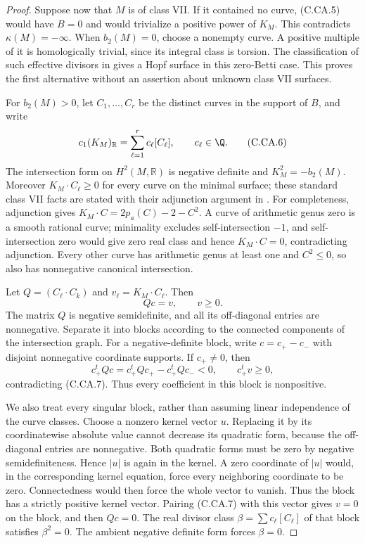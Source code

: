 \begin{proof}
Suppose now that $M$ is of class VII. If it contained no
curve, (C.CA.5) would have $B=0$ and would trivialize a
positive power of $K_M$. This contradicts
$\kappa(M)=-\infty$. When $b_2(M)=0$, choose a nonempty
curve. A positive multiple of it is homologically trivial,
since its integral class is torsion. The classification
of such effective divisors in
\cite[Remark~2.7]{DlousskyTeleman2012} gives a Hopf
surface in this zero-Betti case. This proves the first
alternative without an assertion about unknown class VII
surfaces.

For $b_2(M)>0$, let $C_1,\ldots,C_r$ be the distinct
curves in the support of $B$, and write
\[
 c_1(K_M)_{\mathbb R}=\sum_{\ell=1}^r c_\ell[C_\ell],
 \qquad c_\ell\in\Q.                                  \tag{C.CA.6}
\]
The intersection form on $H^2(M,\mathbb R)$ is negative
definite and $K_M^2=-b_2(M)$. Moreover
$K_M\cdot C_\ell\ge0$ for every curve on the minimal
surface; these standard class VII facts are stated with
their adjunction argument in \cite[\S1, pp.~4--5]{Dloussky2006}.
For completeness, adjunction gives
$K_M\cdot C=2p_a(C)-2-C^2$. A curve of arithmetic genus
zero is a smooth rational curve; minimality excludes
self-intersection $-1$, and self-intersection zero would
give zero real class and hence $K_M\cdot C=0$, contradicting
adjunction. Every other curve has arithmetic genus at
least one and $C^2\le0$, so also has nonnegative canonical
intersection.

Let $Q=(C_\ell\cdot C_k)$ and
$v_\ell=K_M\cdot C_\ell$. Then
\[
                         Qc=v,\qquad v\ge0.             \tag{C.CA.7}
\]
The matrix $Q$ is negative semidefinite, and all its
off-diagonal entries are nonnegative. Separate it into
blocks according to the connected components of the
intersection graph. For a negative-definite block, write
$c=c_+-c_-$ with disjoint nonnegative coordinate supports.
If $c_+\ne0$, then
\[
 c_+^tQc=c_+^tQc_+-c_+^tQc_-<0,
 \qquad c_+^tv\ge0,                                    \tag{C.CA.8}
\]
contradicting (C.CA.7). Thus every coefficient in this
block is nonpositive.

We also treat every singular block, rather than assuming
linear independence of the curve classes. Choose a nonzero
kernel vector $u$. Replacing it by its coordinatewise
absolute value cannot decrease its quadratic form, because
the off-diagonal entries are nonnegative. Both quadratic
forms must be zero by negative semidefiniteness. Hence
$|u|$ is again in the kernel. A zero coordinate of $|u|$
would, in the corresponding kernel equation, force every
neighboring coordinate to be zero. Connectedness would
then force the whole vector to vanish. Thus the block has
a strictly positive kernel vector. Pairing (C.CA.7) with
this vector gives $v=0$ on the block, and then $Qc=0$.
The real divisor class $\beta=\sum c_\ell[C_\ell]$ of
that block satisfies $\beta^2=0$. The ambient negative
definite form forces $\beta=0$.


\end{proof}
